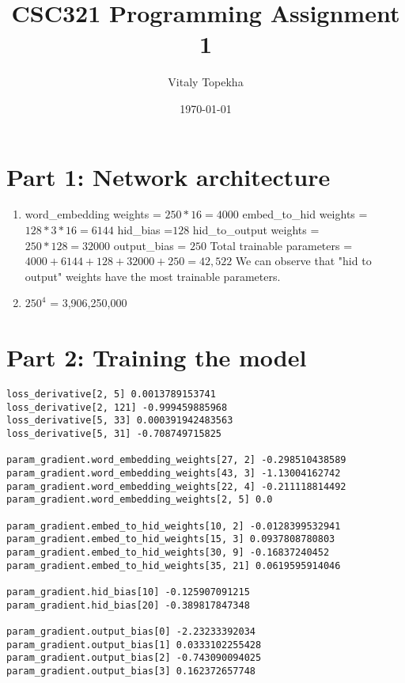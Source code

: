 \documentclass{article}
\title{CSC321  Programming Assignment 1}
\author{Vitaly Topekha}
\date{\today}
\begin{document}
\maketitle

\section{Part 1: Network architecture}

\begin{enumerate}
    \item
    word\_embedding weights = $250 * 16  = 4000$ \newline
    embed\_to\_hid weights = $128 * 3 * 16 = 6144$ \newline
    hid\_bias =$ 128 $\newline
    hid\_to\_output weights = $250 * 128 = 32000 $\newline
    output\_bias = $250$\newline
    Total trainable parameters = $4000 + 6144 + 128 + 32000 + 250 = 42,522$\newline 
    We can observe that "hid to output" weights have the most trainable parameters.
    
    \item $250^{4}$ = 3,906,250,000
    
\end{enumerate}

\section{Part 2: Training the model}
\begin{verbatim}
loss_derivative[2, 5] 0.0013789153741
loss_derivative[2, 121] -0.999459885968
loss_derivative[5, 33] 0.000391942483563
loss_derivative[5, 31] -0.708749715825

param_gradient.word_embedding_weights[27, 2] -0.298510438589
param_gradient.word_embedding_weights[43, 3] -1.13004162742
param_gradient.word_embedding_weights[22, 4] -0.211118814492
param_gradient.word_embedding_weights[2, 5] 0.0

param_gradient.embed_to_hid_weights[10, 2] -0.0128399532941
param_gradient.embed_to_hid_weights[15, 3] 0.0937808780803
param_gradient.embed_to_hid_weights[30, 9] -0.16837240452
param_gradient.embed_to_hid_weights[35, 21] 0.0619595914046

param_gradient.hid_bias[10] -0.125907091215
param_gradient.hid_bias[20] -0.389817847348

param_gradient.output_bias[0] -2.23233392034
param_gradient.output_bias[1] 0.0333102255428
param_gradient.output_bias[2] -0.743090094025
param_gradient.output_bias[3] 0.162372657748
\end{verbatim}
\end{document}
